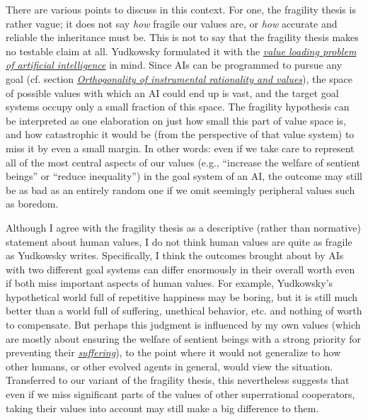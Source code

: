 There are various points to discuss in this context. For one, the
fragility thesis is rather vague; it does not say \emph{how} fragile our
values are, or \emph{how} accurate and reliable the inheritance must be.
This is not to say that the fragility thesis makes no testable claim at
all. Yudkowsky formulated it with the
\href{http://lesswrong.com/lw/llr/superintelligence_20_the_valueloading_problem/}{\emph{value
loading problem of artificial intelligence}} in mind. Since AIs can be
programmed to pursue any goal (cf. section
\protect\hyperlink{orthogonality-of-instrumental-rationality-and-values}{\emph{Orthogonality
of instrumental rationality and values}}), the space of possible
values with which an AI could end up is vast, and the target goal
systems occupy only a small fraction of this space. The fragility
hypothesis can be interpreted as one elaboration on just how small this
part of value space is, and how catastrophic it would be (from the
perspective of that value system) to miss it by even a small margin. In
other words: even if we take care to represent all of the most central
aspects of our values (e.g., ``increase the welfare of sentient beings''
or ``reduce inequality'') in the goal system of an AI, the outcome may
still be as bad as an entirely random one if we omit seemingly
peripheral values such as boredom.

Although I agree with the fragility thesis as a descriptive (rather than
normative) statement about human values, I do not think human values are
quite as fragile as Yudkowsky writes. Specifically, I think the outcomes
brought about by AIs with two different goal systems can differ
enormously in their overall worth even if both miss important aspects of
human values. For example, Yudkowsky's hypothetical world full of
repetitive happiness may be boring, but it is still much better than a
world full of suffering, unethical behavior, etc. and nothing of worth
to compensate. But perhaps this judgment is influenced by my own values
(which are mostly about ensuring the welfare of sentient beings with a
strong priority for preventing their
\href{https://foundational-research.org/the-case-for-suffering-focused-ethics/}{\emph{suffering}}),
to the point where it would not generalize to how other humans, or other
evolved agents in general, would view the situation. Transferred to our
variant of the fragility thesis, this nevertheless suggests that even if
we miss significant parts of the values of other superrational
cooperators, taking their values into account may still make a big
difference to them.

